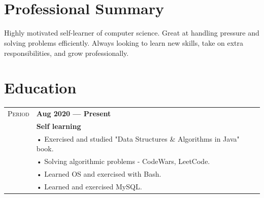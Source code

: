 \documentclass[a4paper, oneside, final]{scrartcl} %
\newcommand{\gray}{\rowcolor[gray]{.90}} %
\begin{document}
\begin{center} %


{\fontsize{30}{30}\selectfont\scshape{}} %

\fontsize{12.5}{15}\selectfont %


{\Large\Letter}  \\ 
  \\
 


\vspace{0.5 cm} %


\section{Professional Summary}

Highly motivated self-learner of computer science. Great at handling pressure and solving problems efficiently. Always looking to learn new skills, take on extra responsibilities, and grow professionally. 


\section{Education}

\begin{tabularx}{0.97\linewidth}{>{\raggedleft\scshape}p{2cm}X}
\gray Period & \textbf{Aug 2020 --- Present}\\
\gray            & \textbf{Self learning}\\
       & • Exercised and studied "Data Structures \& Algorithms in Java" book. \\
       & • Solving algorithmic problems - CodeWars, LeetCode. \\
       & • Learned OS and exercised with Bash.  \\ 
       & • Learned and exercised MySQL. 


\end{tabularx}
\end{center}
\end{document}
